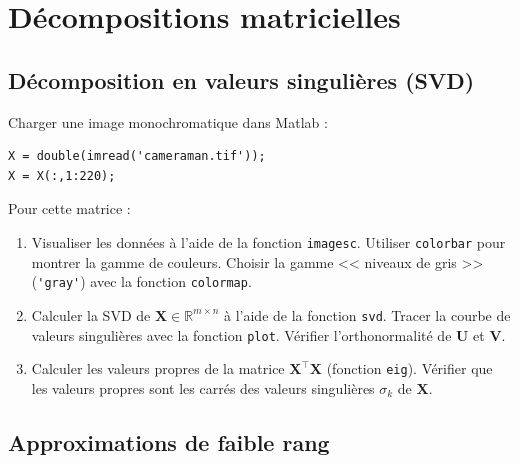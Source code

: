 \chapter{Décompositions matricielles}


\section{Décomposition en valeurs singulières (SVD)}

Charger une image monochromatique dans Matlab :
\begin{lstlisting}
X = double(imread('cameraman.tif'));
X = X(:,1:220);
\end{lstlisting}

Pour cette matrice :
\begin{enumerate}
\item Visualiser les données à l'aide de la fonction \lstinline{imagesc}. Utiliser \lstinline{colorbar}  pour montrer la gamme de couleurs. 
Choisir la gamme << niveaux de gris >> (\lstinline{'gray'}) avec la fonction \lstinline{colormap}.
\item Calculer la SVD  de $\mathbf{X} \in \mathbb{R}^{m\times n}$ à l'aide de la fonction \lstinline{svd}.  Tracer la courbe de valeurs singulières avec la fonction \lstinline{plot}. Vérifier l'orthonormalité de $\mathbf{U}$ et $\mathbf{V}$.

\item Calculer les valeurs propres de la matrice $\mathbf{X}^{\top} \mathbf{X}$ (fonction \lstinline{eig}). Vérifier que les valeurs propres sont les carrés des valeurs singulières $\sigma_k$ de $\mathbf{X}$.

\end{enumerate}

\section{Approximations de faible rang}

